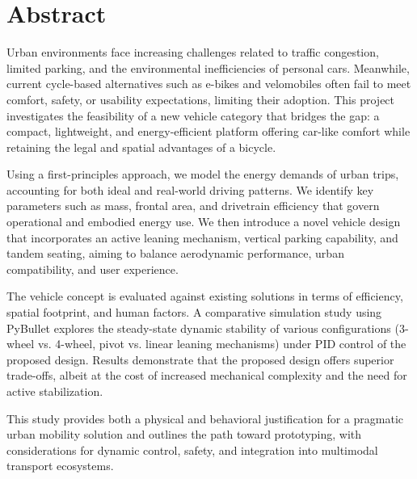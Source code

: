 \documentclass[a4paper, 11 pt]{article}
\begin{document}
{ %

\section*{Abstract}
Urban environments face increasing challenges related to traffic congestion, limited parking, and the environmental inefficiencies of personal cars. Meanwhile, current cycle-based alternatives such as e-bikes and velomobiles often fail to meet comfort, safety, or usability expectations, limiting their adoption. This project investigates the feasibility of a new vehicle category that bridges the gap: a compact, lightweight, and energy-efficient platform offering car-like comfort while retaining the legal and spatial advantages of a bicycle.

Using a first-principles approach, we model the energy demands of urban trips, accounting for both ideal and real-world driving patterns. We identify key parameters such as mass, frontal area, and drivetrain efficiency that govern operational and embodied energy use. We then introduce a novel vehicle design that incorporates an active leaning mechanism, vertical parking capability, and tandem seating, aiming to balance aerodynamic performance, urban compatibility, and user experience.

The vehicle concept is evaluated against existing solutions in terms of efficiency, spatial footprint, and human factors. A comparative simulation study using PyBullet explores the steady-state dynamic stability of various configurations (3-wheel vs. 4-wheel, pivot vs. linear leaning mechanisms) under PID control of the proposed design. Results demonstrate that the proposed design offers superior trade-offs, albeit at the cost of increased mechanical complexity and the need for active stabilization.

This study provides both a physical and behavioral justification for a pragmatic urban mobility solution and outlines the path toward prototyping, with considerations for dynamic control, safety, and integration into multimodal transport ecosystems.

\newpage
}

 











\newpage
 

\end{document}
